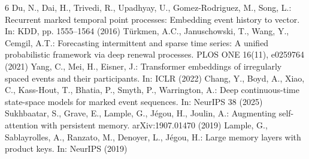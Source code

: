 \documentclass[runningheads]{llncs}
\begin{document}
\begin{thebibliography}{6}
Du, N., Dai, H., Trivedi, R., Upadhyay, U.,
Gomez-Rodriguez, M., Song, L.:
Recurrent marked temporal point processes:
Embedding event history to vector.
In: KDD, pp. 1555--1564 (2016)
T\"urkmen, A.C., Januschowski, T., Wang, Y., Cemgil, A.T.:
Forecasting intermittent and sparse time series:
A unified probabilistic framework via deep renewal processes.
PLOS ONE 16(11), e0259764 (2021)
Yang, C., Mei, H., Eisner, J.:
Transformer embeddings of irregularly spaced events
and their participants. In: ICLR (2022)
Chang, Y., Boyd, A., Xiao, C., Kass-Hout, T.,
Bhatia, P., Smyth, P., Warrington, A.:
Deep continuous-time state-space models for marked
event sequences. In: NeurIPS 38 (2025)
Sukhbaatar, S., Grave, E., Lample, G., J\'egou, H.,
Joulin, A.: Augmenting self-attention with
persistent memory. arXiv:1907.01470 (2019)
Lample, G., Sablayrolles, A., Ranzato, M.,
Denoyer, L., J\'egou, H.:
Large memory layers with product keys.
In: NeurIPS (2019)
\end{thebibliography}
\end{document}
